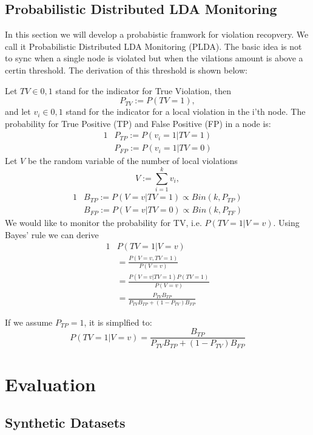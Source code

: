\documentclass[11pt,twocolumn,varwidth=true,a4paper,fleqn]{article}
\begin{document}
\subsection{Probabilistic Distributed LDA Monitoring}
In this section we will develop a probabistic framwork for violation recopvery.
We call it Probabilistic Distributed LDA Monitoring (PLDA). The basic idea is
not to sync when a single node is violated but when the vilations amount is
above a certin threshold. The derivation of this threshold is shown below:

Let $TV \in {0,1}$ stand for the indicator for True
Violation, then  
\begin{equation*}
P_{TV} := P(TV = 1),
\end{equation*}
and let $v_i \in {0,1}$ stand for the indicator for a local violation in the
i'th node. The probability for True Positive (TP) and False Positive (FP) in a
node is:
\begin{alignat*}{1}
& P_{TP} := P(v_i=1 | TV=1) \\
& P_{FP} := P(v_i=1 | TV=0)
\end{alignat*}
Let $V$ be the random variable of the number of local violations
\begin{equation*}
V := \sum_{i=1}^k v_i,
\end{equation*}
\begin{alignat*}{1}
& B_{TP} := P(V=v | TV=1) \propto Bin(k,P_{TP}) \\
& B_{FP} := P(V=v | TV=0) \propto Bin(k,P_{TF})
\end{alignat*}
We would like to monitor the probability for TV, i.e. $P(TV=1|V=v)$. Using
Bayes' rule we can derive
\begin{alignat*}{1}
& P(TV=1|V=v) \\
& = \frac{P(V=v, TV=1)}{P(V=v)}\\
& = \frac{P(V=v|TV=1)P(TV=1)}{P(V=v)} \\
& = \frac{P_{TV}B_{TP}}{P_{TV}B_{TP} + (1-P_{TV})B_{FP}}
\end{alignat*}

If we assume $P_{TP}=1$, it is simplfied to:
\begin{equation*}
P(TV=1|V=v) = \frac{B_{TP}}{P_{TV}B_{TP} + (1-P_{TV})B_{FP}}
\end{equation*}
\section{Evaluation}
\subsection{Synthetic Datasets}
\end{document}
